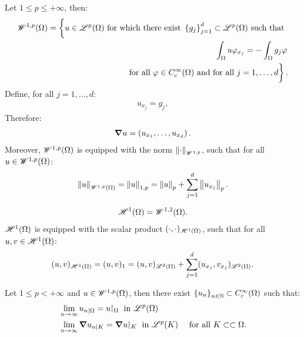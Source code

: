 \begin{definition}
    Let $1 \leq p \leq +\infty$, then:
    \begin{align} %
        \SpaceWkp{1}{p}(\Omega) = \left\{ \vphantom{\int_{\Omega}} u \in \SpaceLp{p}(\Omega) \text{ for which there exist } \left\{ g_j \right\}_{j = 1}^{d} \subset \SpaceLp{p}(\Omega) \text{ such that } \right. \notag \\ 
        \left. \int_{\Omega} u \varphi_{x_j} = - \int_{\Omega} g_j \varphi \right. \notag \\
        \left. \text{ for all } \varphi \in C_c^{\infty}(\Omega) \text{ and for all } j = 1, \dots, d \vphantom{\int_{\Omega}} \right\}.
    \end{align}
    Define, for all $j = 1, \dots, d$:
    \begin{align}
        u_{x_j} = g_j,
    \end{align}
    Therefore:
    \begin{align}
        \bm{\nabla} u = \left( u_{x_1}, \dots, u_{x_d} \right).
    \end{align}
    Moreover, $\mathscr{W}^{1, p}(\Omega)$ is equipped with the norm $\left\lVert \cdot \right\rVert_{\mathscr{W}^{1, p}}$, such that for all $u \in \mathscr{W}^{1, p}(\Omega)$:
    \begin{align}
        \left\lVert u \right\rVert_{\mathscr{W}^{1, p}(\Omega)} = \left\lVert u \right\rVert_{1, p} = \left\lVert u \right\rVert_p + \sum_{j = 1}^d \left\lVert u_{x_j} \right\rVert_p.
    \end{align}
\end{definition}

\begin{definition}
    \begin{align}
        \mathscr{H}^{1}(\Omega) = \mathscr{W}^{1, 2}(\Omega).
    \end{align}
    $\mathscr{H}^{1}(\Omega)$ is equipped with the scalar product $(\cdot, \cdot)_{\mathscr{H}^{1}(\Omega)}$, such that for all $u, v \in \mathscr{H}^{1}(\Omega)$:
    \begin{align}
        (u, v)_{\mathscr{H}^{1}(\Omega)} = (u, v)_1 = (u, v)_{\mathscr{L}^{2}(\Omega)} + \sum_{j = 1}^d (u_{x_j}, v_{x_j})_{\mathscr{L}^{2}(\Omega)}.
    \end{align}
\end{definition}

\begin{theorem}
    Let $1 \leq p < +\infty$ and $u \in \mathscr{W}^{1, p}(\Omega)$, then there exist $\left\{ u_n \right\}_{n \in \mathbb{N}} \subset C_c^{\infty}(\Omega)$ such that:
    \begin{align}
        & \lim_{n \rightarrow \infty} u_{n \mid \Omega} = u \!\!\restriction_{\Omega} \text { in } \mathscr{L}^{p}(\Omega)\\
        & \lim_{n \rightarrow \infty} \bm{\nabla} u_{n \mid K} = \bm{\nabla} u \!\!\restriction_{K} \text { in } \mathscr{L}^{p}(K) &\text{ for all } K \subset \subset \Omega.
    \end{align}
\end{theorem}

